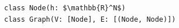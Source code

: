 \documentclass[border=10pt]{standalone}
\begin{document}
\begin{lstlisting}
class Node(h: $\mathbb{R}^N$)
class Graph(V: [Node], E: [(Node, Node)])
\end{lstlisting}
\end{document}
